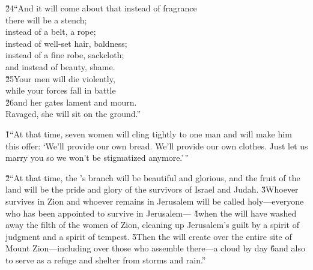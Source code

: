 \begin{poetry}
\poeml \v{24}``And it will come about that instead of fragrance \\
\poemll    there will be a stench; \\
\poeml instead of a belt, a rope; \\
\poemll    instead of well-set hair, baldness; \\
\poeml instead of a fine robe, sackcloth; \\
\poemll    and instead of beauty, shame. \\
\poeml \v{25}Your men will die violently, \\
\poemll    while your forces fall in battle \\
\poeml \v{26}and her gates lament and mourn. \\
\poemll    Ravaged, she will sit on the ground.''
\end{poetry}

\v{1}``At that time, seven women will cling tightly to one man and will make him this offer: `We'll provide our own bread. We'll provide our own clothes. Just let us marry you so we won't be stigmatized anymore.'\,''

\v{2}``At that time, the 's branch will be beautiful and glorious, and the fruit of the land will be the pride and glory of the survivors of Israel and Judah. \v{3}Whoever survives in Zion and whoever remains in Jerusalem will be called holy---everyone who has been appointed to survive in Jerusalem--- \v{4}when the  will have washed away the filth of the women of Zion, cleaning up Jerusalem's guilt by a spirit of judgment and a spirit of tempest. \v{5}Then the  will create over the entire site of Mount Zion---including over those who assemble there---a cloud by day \v{6}and also to serve as a refuge and shelter from storms and rain.''

